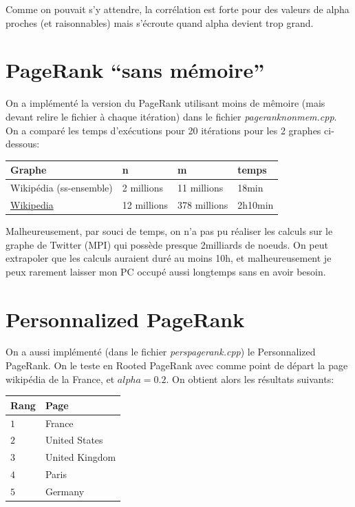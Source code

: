 \documentclass{report}
\begin{document}
Comme on pouvait s'y attendre, la corrélation est forte pour des valeurs de alpha proches (et raisonnables) mais s'écroute quand alpha devient trop grand.

\section{PageRank ``sans mémoire''}
On a implémenté la version du PageRank utilisant moins de mêmoire (mais devant relire le fichier à chaque itération) dans le fichier \textit{pageranknonmem.cpp}. On a comparé les temps d'exécutions pour 20 itérations pour les 2 graphes ci-dessous:
\begin{center}
  \begin{tabular}{|l|l|l|l|}
    \hline
    Graphe & n & m & temps\\
    \hline
    Wikipédia (ss-ensemble) & 2 millions & 11 millions & 18min\\
    \href{http://konect.uni-koblenz.de/networks/wikipedia_link_en}{Wikipedia} & 12 millions & 378 millions & 2h10min\\
    \hline
  \end{tabular}
\end{center}
Malheureusement, par souci de temps, on n'a pas pu réaliser les calculs sur le graphe de Twitter (MPI) qui possède presque 2milliards de noeuds. On peut extrapoler que les calculs auraient duré au moins 10h, et malheureusement je peux rarement laisser mon PC occupé aussi longtemps sans en avoir besoin.

\section{Personnalized PageRank}
On a aussi implémenté (dans le fichier \textit{perspagerank.cpp}) le Personnalized PageRank. On le teste en Rooted PageRank avec comme point de départ la page wikipédia de la France, et $alpha = 0.2$. On obtient alors les résultats suivants:

\begin{center}
  \begin{tabular}{|l|l|}
    \hline
    Rang & Page\\
    \hline
    $1$ & France\\
    $2$ & United States\\
    $3$ & United Kingdom\\
    $4$ & Paris\\
    $5$ & Germany\\
    \hline
  \end{tabular}
\end{center}
\end{document}
